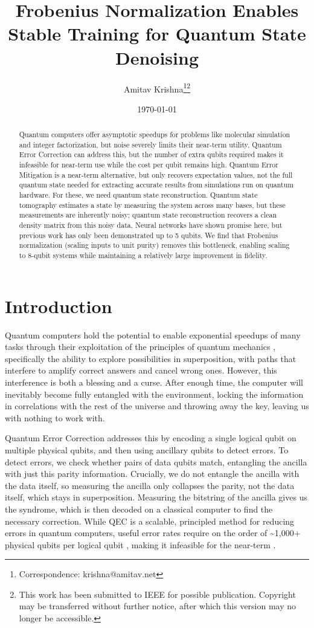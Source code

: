 \documentclass{ieeeqccl}
\author{Amitav Krishna\thanks{Correspondence: krishna@amitav.net}\thanks{This work has been submitted to IEEE for possible publication.  Copyright may be transferred without further notice, after which this version may no longer be accessible.}}
\date{\today}
\title{Frobenius Normalization Enables Stable Training for Quantum State Denoising}
\begin{document}
\maketitle
\begin{abstract}
Quantum computers offer asymptotic speedups for problems like molecular simulation and integer factorization, but noise severely limits their near-term utility.  Quantum Error Correction can address this, but the number of extra qubits required makes it infeasible for near-term use while the cost per qubit remains high.  Quantum Error Mitigation is a near-term alternative, but only recovers expectation values, not the full quantum state needed for extracting accurate results from simulations run on quantum hardware.  For these, we need quantum state reconstruction.  Quantum state tomography estimates a state by measuring the system across many bases, but these measurements are inherently noisy; quantum state reconstruction recovers a clean density matrix from this noisy data.  Neural networks have shown promise here, but previous work has only been demonstrated up to 5 qubits.  We find that Frobenius normalization (scaling inputs to unit purity) removes this bottleneck, enabling scaling to 8-qubit systems while maintaining a relatively large improvement in fidelity.
\end{abstract}

\section{Introduction}
\label{sec:org89ee394}
Quantum computers hold the potential to enable exponential speedups of many tasks through their exploitation of the principles of quantum mechanics \autocite{feynman1982simulating}, specifically the ability to explore possibilities in superposition, with paths that interfere to amplify correct answers and cancel wrong ones. However, this interference is both a blessing and a curse. After enough time, the computer will inevitably become fully entangled with the environment, locking the information in correlations with the rest of the universe and throwing away the key, leaving us with nothing to work with.

Quantum Error Correction addresses this by encoding a single logical qubit on multiple physical qubits, and then using ancillary qubits to detect errors. To detect errors, we check whether pairs of data qubits match, entangling the ancilla with just this parity information. Crucially, we do not entangle the ancilla with the data itself, so measuring the ancilla only collapses the parity, not the data itself, which stays in superposition. Measuring the bitstring of the ancilla gives us the syndrome, which is then decoded on a classical computer to find the necessary correction. While QEC is a scalable, principled method for reducing errors in quantum computers, useful error rates require on the order of \textasciitilde{}1,000+ physical qubits per logical qubit \autocite{2024}, making it infeasible for the near-term \autocite{preskill2018quantum}.
\end{document}
